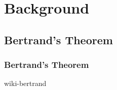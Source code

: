 % 

\section{Background}
\subsection{Bertrand's Theorem}

\begin{frame}\frametitle{Bertrand's Theorem}
\center
	\begin{overpic}[ scale = 0.3 ]
		{\pLocalGraphics wiki-bertrand}
	\end{overpic}%
	\\
\end{frame}

\endinput  %

\subsection{Lyapunov Stability}

\begin{frame}\frametitle{Lyapunov Stability}
\center
	\href{https://en.wikipedia.org/wiki/Lyapunov_stability}{
	\begin{overpic}[ scale = 0.3 ]
		{\pLocalGraphics lyapunov}
	\end{overpic}}
	\\
	\mg{\small{\cite{enwiki:1233536190}}}
\end{frame}


\subsection{Color Confinement}

